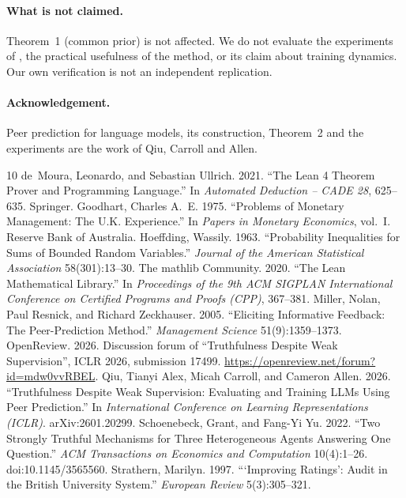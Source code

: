 \documentclass[11pt]{article}
\theoremstyle{remark}
\begin{document}
\paragraph{What is not claimed.} Theorem~1 (common prior) is not affected. We do not evaluate the experiments of \citet{qiu2026truthfulness}, the practical usefulness of the method, or its claim about training dynamics. Our own verification is not an independent replication.

\paragraph{Acknowledgement.} Peer prediction for language models, its construction, Theorem~2 and the experiments are the work of Qiu, Carroll and Allen.

\begin{thebibliography}{10}
 de~Moura, Leonardo, and Sebastian Ullrich. 2021. ``The Lean 4 Theorem Prover and Programming Language.'' In \emph{Automated Deduction -- CADE 28}, 625--635. Springer.
 Goodhart, Charles A.~E. 1975. ``Problems of Monetary Management: The U.K. Experience.'' In \emph{Papers in Monetary Economics}, vol.~I. Reserve Bank of Australia.
 Hoeffding, Wassily. 1963. ``Probability Inequalities for Sums of Bounded Random Variables.'' \emph{Journal of the American Statistical Association} 58(301):13--30.
 The mathlib Community. 2020. ``The Lean Mathematical Library.'' In \emph{Proceedings of the 9th ACM SIGPLAN International Conference on Certified Programs and Proofs (CPP)}, 367--381.
 Miller, Nolan, Paul Resnick, and Richard Zeckhauser. 2005. ``Eliciting Informative Feedback: The Peer-Prediction Method.'' \emph{Management Science} 51(9):1359--1373.
 OpenReview. 2026. Discussion forum of ``Truthfulness Despite Weak Supervision'', ICLR 2026, submission 17499. \url{https://openreview.net/forum?id=mdw0vvRBEL}.
 Qiu, Tianyi Alex, Micah Carroll, and Cameron Allen. 2026. ``Truthfulness Despite Weak Supervision: Evaluating and Training LLMs Using Peer Prediction.'' In \emph{International Conference on Learning Representations (ICLR)}. arXiv:2601.20299.
 Schoenebeck, Grant, and Fang-Yi Yu. 2022. ``Two Strongly Truthful Mechanisms for Three Heterogeneous Agents Answering One Question.'' \emph{ACM Transactions on Economics and Computation} 10(4):1--26. doi:10.1145/3565560.
 Strathern, Marilyn. 1997. ```Improving Ratings': Audit in the British University System.'' \emph{European Review} 5(3):305--321.
\end{thebibliography}
\end{document}
